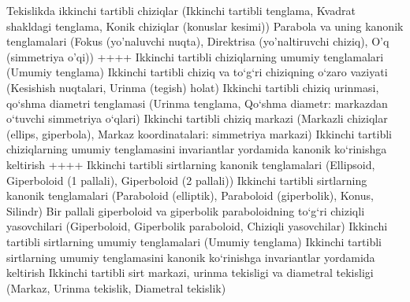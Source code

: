 Tekislikda ikkinchi tartibli chiziqlar (Ikkinchi tartibli tenglama, Kvadrat shakldagi tenglama, Konik chiziqlar (konuslar kesimi))
Parabola va uning kanonik tenglamalari (Fokus (yo’naluvchi nuqta), Direktrisa (yo’naltiruvchi chiziq), O’q (simmetriya o’qi))
++++
Ikkinchi tartibli chiziqlarning umumiy tenglamalari (Umumiy tenglama)
Ikkinchi tartibli chiziq va to‘g‘ri chiziqning o‘zaro vaziyati (Kesishish nuqtalari, Urinma (tegish) holat)
Ikkinchi tartibli chiziq urinmasi, qo‘shma diametri tenglamasi (Urinma tenglama, Qo‘shma diametr: markazdan o‘tuvchi simmetriya o‘qlari)
Ikkinchi tartibli chiziq markazi (Markazli chiziqlar (ellips, giperbola), Markaz koordinatalari: simmetriya markazi)
Ikkinchi tartibli chiziqlarning umumiy tenglamasini invariantlar yordamida kanonik ko‘rinishga keltirish
++++
Ikkinchi tartibli sirtlarning kanonik tenglamalari (Ellipsoid, Giperboloid (1 pallali), Giperboloid (2 pallali))
Ikkinchi tartibli sirtlarning kanonik tenglamalari (Paraboloid (elliptik), Paraboloid (giperbolik), Konus, Silindr)
Bir pallali giperboloid va giperbolik paraboloidning to‘g‘ri chiziqli yasovchilari (Giperboloid, Giperbolik paraboloid, Chiziqli yasovchilar)
Ikkinchi tartibli sirtlarning umumiy tenglamalari (Umumiy tenglama)
Ikkinchi tartibli sirtlarning umumiy tenglamasini kanonik ko‘rinishga invariantlar yordamida keltirish
Ikkinchi tartibli sirt markazi, urinma tekisligi va diametral tekisligi (Markaz, Urinma tekislik, Diametral tekislik)